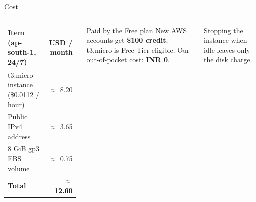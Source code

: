 \documentclass[aspectratio=169,11pt]{beamer}
\newcommand{\muted}[1]{\textcolor{mist}{#1}}
\begin{document}
\begin{frame}{Cost}
  \begin{columns}[c]
    \small
    \begin{tabularx}{\linewidth}{@{}X r@{}}
      \toprule
      \textbf{Item (ap-south-1, 24/7)} & \textbf{USD / month} \\
      \midrule
      t3.micro instance (\$0.0112 / hour) & $\approx$ 8.20 \\
      Public IPv4 address               & $\approx$ 3.65 \\
      8 GiB gp3 EBS volume              & $\approx$ 0.75 \\
      \midrule
      \textbf{Total}                    & $\approx$ \textbf{12.60} \\
      \bottomrule
    \end{tabularx}
    \begin{exampleblock}{Paid by the Free plan}
      \small New AWS accounts get \textbf{\$100 credit}; t3.micro is Free Tier eligible. Our out-of-pocket cost: \textbf{INR 0}.
    \end{exampleblock}
    \vspace{0.3em}
    \muted{\small Stopping the instance when idle leaves only the disk charge.}
  \end{columns}
\end{frame}

\end{document}
